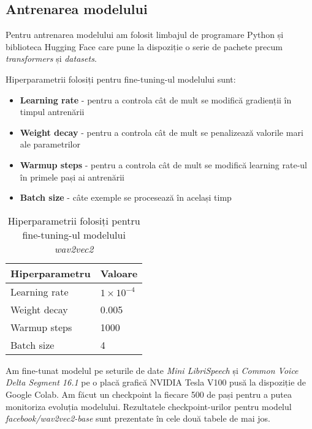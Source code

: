 \subsection{Antrenarea modelului}
Pentru antrenarea modelului am folosit limbajul de programare Python și biblioteca Hugging Face
care pune la dispoziție o serie de pachete precum \textit{transformers} și \textit{datasets}.
\par
Hiperparametrii folosiți pentru fine-tuning-ul modelului sunt:
\begin{itemize}
    \item \textbf{Learning rate} - pentru a controla cât de mult se modifică gradienții în timpul
    antrenării 
    \item \textbf{Weight decay} - pentru a controla cât de mult se penalizează valorile mari ale
    parametrilor 
    \item \textbf{Warmup steps} - pentru a controla cât de mult se modifică learning rate-ul în
    primele pași ai antrenării
    \item \textbf{Batch size} - câte exemple se procesează în același timp
\end{itemize}

\vspace{0.5em}

\begin{table}[h]
    \centering
    \label{tab:wav2vec2-hyperparameters}
    \begin{tabular}{ll}
    \hline
    \textbf{Hiperparametru} & \textbf{Valoare} \\ \hline
    Learning rate & $1 \times 10^{-4}$ \\
    Weight decay & 0.005 \\
    Warmup steps & 1000 \\
    Batch size & 4 \\ \hline
    \end{tabular}
    \caption{Hiperparametrii folosiți pentru fine-tuning-ul modelului \textit{wav2vec2}}
\end{table}

\par
Am fine-tunat modelul pe seturile de date \textit{Mini LibriSpeech} și \textit{Common Voice Delta Segment 16.1}
pe o placă grafică NVIDIA Tesla V100 pusă la dispoziție de Google Colab. Am făcut un checkpoint la fiecare
500 de pași pentru a putea monitoriza evoluția modelului. Rezultatele checkpoint-urilor pentru modelul
\textit{facebook/wav2vec2-base} sunt prezentate în cele două tabele de mai jos.


